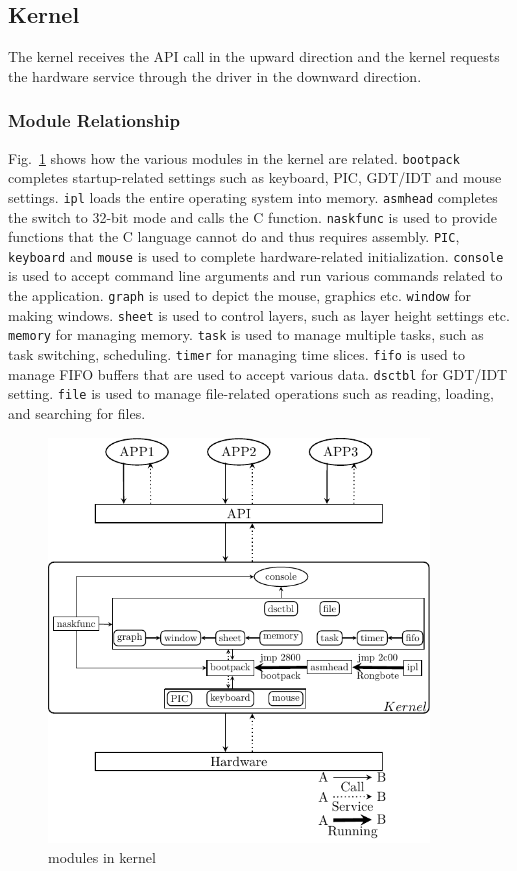 \documentclass{swfcthesis}
\begin{document}
\subsection{Kernel}
\label{sec:kernel}
The kernel receives the API call in the upward direction and the kernel requests the
hardware service through the driver in the downward direction.

\subsubsection{Module Relationship}

Fig.~\ref{fig:kernel} shows how the various modules in
the kernel are related. \texttt{bootpack} completes startup-related settings such as
keyboard, PIC, GDT/IDT and mouse settings. \texttt{ipl} loads the entire operating system
into memory. \texttt{asmhead} completes the switch to 32-bit mode and calls the C
function. \texttt{naskfunc} is used to provide functions that the C language cannot do and
thus requires assembly. \texttt{PIC}, \texttt{keyboard} and \texttt{mouse} is used to
complete hardware-related initialization. \texttt{console} is used to accept command line
arguments and run various commands related to the application. \texttt{graph} is used to
depict the mouse, graphics etc. \texttt{window} for making windows. \texttt{sheet} is used to
control layers, such as layer height settings etc. \texttt{memory} for managing
memory. \texttt{task} is used to manage multiple tasks, such as task switching,
scheduling. \texttt{timer} for managing time slices. \texttt{fifo} is used to manage FIFO buffers
that are used to accept various data. \texttt{dsctbl} for GDT/IDT setting. \texttt{file} is used to
manage file-related operations such as reading, loading, and searching for files. 


\begin{figure}[!htbp]
  \centering
  \includegraphics[width=0.9\textwidth]{topDesKernel}
  \caption{modules in kernel}
  \label{fig:kernel}
\end{figure}
\end{document}
